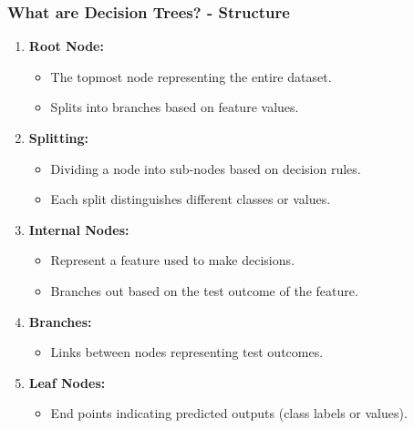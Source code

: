 \documentclass[aspectratio=169]{beamer}
\begin{document}
\begin{frame}[fragile]
    \frametitle{What are Decision Trees? - Structure}
    \begin{enumerate}
        \item \textbf{Root Node:} 
            \begin{itemize}
                \item The topmost node representing the entire dataset.
                \item Splits into branches based on feature values.
            \end{itemize}
        \item \textbf{Splitting:}
            \begin{itemize}
                \item Dividing a node into sub-nodes based on decision rules.
                \item Each split distinguishes different classes or values.
            \end{itemize}
        \item \textbf{Internal Nodes:}
            \begin{itemize}
                \item Represent a feature used to make decisions.
                \item Branches out based on the test outcome of the feature.
            \end{itemize}
        \item \textbf{Branches:}
            \begin{itemize}
                \item Links between nodes representing test outcomes.
            \end{itemize}
        \item \textbf{Leaf Nodes:}
            \begin{itemize}
                \item End points indicating predicted outputs (class labels or values).
            \end{itemize}
    \end{enumerate}
\end{frame}
\end{document}

